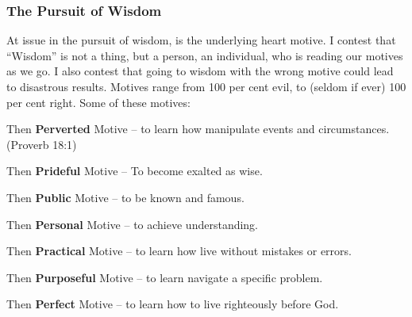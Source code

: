 \subsubsection{The Pursuit of Wisdom}
At issue in the pursuit of wisdom, is the underlying heart motive. I contest that ``Wisdom'' is not a thing, but a person, an individual, who is reading our motives as we go. I also contest that going to wisdom with the wrong motive could lead to disastrous results. Motives range from 100 per cent evil, to (seldom if ever) 100 per cent right. Some of these motives:
\begin{compactenum}[I.]
    \item Then \textbf{Perverted} Motive -- to learn how manipulate events and circumstances. (Proverb 18:1)
    \item Then \textbf{Prideful} Motive -- To become exalted as wise. 
    \item Then \textbf{Public} Motive -- to be known and famous. 
    \item Then \textbf{Personal} Motive -- to achieve understanding. 
    \item Then \textbf{Practical} Motive -- to learn how live without mistakes or errors. 
    \item Then \textbf{Purposeful} Motive -- to learn navigate a specific problem. 
    \item Then \textbf{Perfect} Motive -- to learn how to live righteously before God. 
\end{compactenum}

